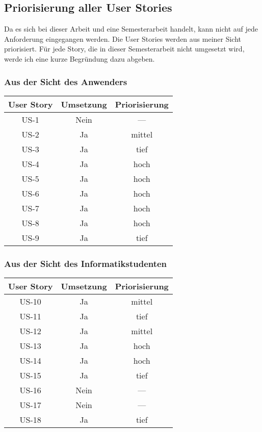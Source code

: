 \documentclass[listof=totocnumbered, bibliography=totocnumbered]{scrreprt}
\begin{document}
  \subsection{Priorisierung aller User Stories}
  
  Da es sich bei dieser Arbeit und eine Semesterarbeit handelt, kann nicht auf
  jede Anforderung eingegangen werden. Die User Stories werden aus meiner Sicht
  priorisiert. Für jede Story, die in dieser Semesterarbeit nicht umgesetzt
  wird, werde ich eine kurze Begründung dazu abgeben.
  
  \subsubsection{Aus der Sicht des Anwenders}
  
  \begin{tabular}{ccc}
    \toprule
    User Story & Umsetzung & Priorisierung \\
    \midrule
    US-1 & Nein & --- \\
    US-2 & Ja & mittel \\
    US-3 & Ja & tief \\
    US-4 & Ja & hoch \\
    US-5 & Ja & hoch \\
    US-6 & Ja & hoch \\
    US-7 & Ja & hoch \\
    US-8 & Ja & hoch \\
    US-9 & Ja & tief \\
    \bottomrule
  \end{tabular}
  
  \subsubsection{Aus der Sicht des Informatikstudenten}
  
  \begin{tabular}{ccc}
    \toprule
    User Story & Umsetzung & Priorisierung \\
    \midrule
    US-10 & Ja & mittel \\
    US-11 & Ja & tief \\
    US-12 & Ja & mittel \\
    US-13 & Ja & hoch \\
    US-14 & Ja & hoch \\
    US-15 & Ja & tief \\
    US-16 & Nein & --- \\
    US-17 & Nein & --- \\
    US-18 & Ja & tief \\
    \bottomrule
  \end{tabular}
  
\end{document}
